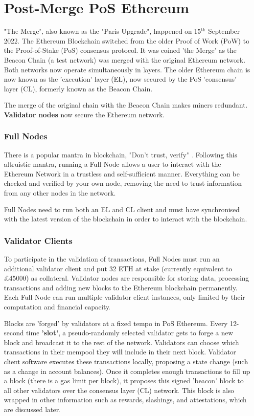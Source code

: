 \section{Post-Merge PoS Ethereum}

"The Merge", also known as the "Paris Upgrade", happened on 15$\mathrm{^{th}}$ September 2022. The Ethereum Blockchain switched from the older Proof of Work (PoW) to the Proof-of-Stake (PoS) consensus protocol. It was coined 'the Merge' as the Beacon Chain (a test network) was merged with the original Ethereum network. Both networks now operate simultaneously in layers. The older Ethereum chain is now known as the 'execution' layer (EL), now secured by the PoS 'consensus' layer (CL), formerly known as the Beacon Chain. 

The merge of the original chain with the Beacon Chain makes miners redundant. \textbf{Validator nodes} now secure the Ethereum network. 

\subsubsection{Full Nodes}
There is a popular mantra in blockchain, "Don't trust, verify" \cite{EthereumEthereum.org}. Following this altruistic mantra, running a Full Node allows a user to interact with the Ethereum Network in a trustless and self-sufficient manner. Everything can be checked and verified by your own node, removing the need to trust information from any other nodes in the network. 

Full Nodes need to run both an EL and CL client and must have  synchronised with the latest version of the blockchain in order to interact with the blockchain. 

\subsubsection{Validator Clients}
\label{ValidatorsLitRev}
To participate in the validation of transactions, Full Nodes must run an additional validator client and put 32 ETH at stake (currently equivalent to £45000) as collateral. Validator nodes are responsible for storing data, processing transactions and adding new blocks to the Ethereum blockchain permanently. Each Full Node can run multiple validator client instances, only limited by their computation and financial capacity.

Blocks are 'forged' by validators at a fixed tempo in PoS Ethereum. Every 12-second time \textbf{'slot'}, a pseudo-randomly selected validator gets to forge a new block and broadcast it to the rest of the network. Validators can choose which transactions in their mempool they will include in their next block. Validator client software executes these transactions locally, proposing a state change (such as a change in account balances). Once it completes enough transactions to fill up a block (there is a gas limit per block), it proposes this signed 'beacon' block to all other validators over the consensus layer (CL) network. This block is also wrapped in other information such as rewards, slashings, and attestations, which are discussed later.

